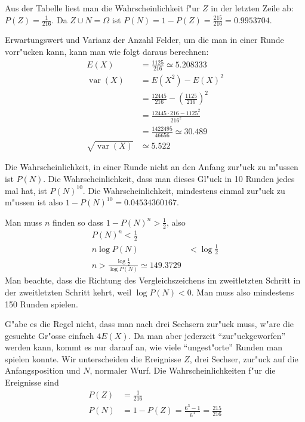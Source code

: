 \begin{loesung}
\begin{center}
\begin{tabular}{|ccc|c|r|r|r|}
\hline
\end{tabular}
\end{center}
\begin{teilaufgaben}
\item Aus der Tabelle liest man die Wahrscheinlichkeit f"ur $Z$ in der letzten
Zeile ab: $P(Z)=\frac1{216}$. Da $Z\cup N=\Omega$ ist
$P(N)=1-P(Z)=\frac{215}{216}=0.9953704$.
\item
Erwartungswert und Varianz der Anzahl Felder, um die man in einer Runde vorr"ucken kann,
kann man wie folgt daraus berechnen:
\begin{align*}
E(X)
&=\frac{1125}{216}\simeq 5.208333
\\
\operatorname{var}(X)
&= E(X^2)-E(X)^2\\
&=\frac{12445}{216}-\left(\frac{1125}{216}\right)^2\\
&=\frac{12445\cdot 216  - 1125^2}{216^2}\\
&=\frac{1422495}{46656}\simeq 30.489\\
\sqrt{\operatorname{var}(X)}&\simeq 5.522
\end{align*}
\item
Die Wahrscheinlichkeit, in einer Runde nicht an den Anfang zur"uck
zu m"ussen ist $P(N)$. Die Wahrscheinlichkeit, dass man dieses
Gl"uck in 10 Runden jedes mal hat, ist $P(N)^{10}$. Die Wahrscheinlichkeit,
mindestens einmal zur"uck zu m"ussen ist also $1-P(N)^{10}=0.04534360167$.
\item
Man muss $n$ finden so dass $1-P(N)^n>\frac12$, also
\begin{align*}
P(N)^n<\frac12\\
n\log P(N)&<\log\frac12\\
n>\frac{\log\frac12}{\log P(N)}\simeq 149.3729
\end{align*}
Man beachte, dass die Richtung des Vergleichszeichens im zweitletzten Schritt
in der zweitletzten  Schritt kehrt, weil $\log P(N) < 0$. Man muss also mindestens
150 Runden spielen.
\item
G"abe es die Regel nicht, dass man nach drei Sechsern zur"uck muss,
w"are die gesuchte Gr"osse einfach $4 E(X)$. Da man aber
jederzeit ``zur"uckgeworfen'' werden kann, kommt es nur darauf an,
wie viele ``ungest"orte'' Runden man spielen konnte.
Wir unterscheiden die Ereignisse $Z$, drei Sechser, zur"uck auf die
Anfangsposition und $N$, normaler Wurf. Die Wahrscheinlichkeiten f"ur
die Ereignisse sind
\begin{align*}
P(Z)&= \frac1{216}\\
P(N)&= 1-P(Z)=\frac{6^3-1}{6^3}=\frac{215}{216}

\end{align*}
\end{teilaufgaben}
\end{loesung}
